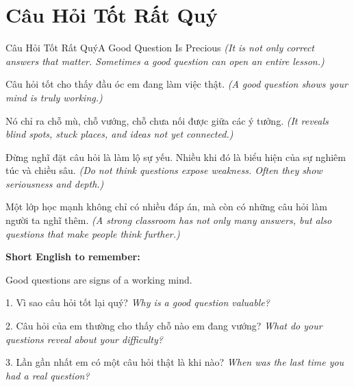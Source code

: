 \section{Câu Hỏi Tốt Rất Quý}
\begin{truyen}{Câu Hỏi Tốt Rất Quý}{A Good Question Is Precious}
\textit{(It is not only correct answers that matter. Sometimes a good question can open an entire lesson.)}

Câu hỏi tốt cho thấy đầu óc em đang làm việc thật.
\textit{(A good question shows your mind is truly working.)}

Nó chỉ ra chỗ mù, chỗ vướng, chỗ chưa nối được giữa các ý tưởng.
\textit{(It reveals blind spots, stuck places, and ideas not yet connected.)}

Đừng nghĩ đặt câu hỏi là làm lộ sự yếu. Nhiều khi đó là biểu hiện của sự nghiêm túc và chiều sâu.
\textit{(Do not think questions expose weakness. Often they show seriousness and depth.)}
\end{truyen}

\begin{baihoc}
Một lớp học mạnh không chỉ có nhiều đáp án, mà còn có những câu hỏi làm người ta nghĩ thêm.
\textit{(A strong classroom has not only many answers, but also questions that make people think further.)}
\end{baihoc}

\begin{ghinhoanh}
\textbf{Short English to remember:}

Good questions are signs of a working mind.

\end{ghinhoanh}

\begin{tuhocnhanh}
1. Vì sao câu hỏi tốt lại quý? \textit{Why is a good question valuable?}

2. Câu hỏi của em thường cho thấy chỗ nào em đang vướng? \textit{What do your questions reveal about your difficulty?}

3. Lần gần nhất em có một câu hỏi thật là khi nào? \textit{When was the last time you had a real question?}
\end{tuhocnhanh}
\ngancach

